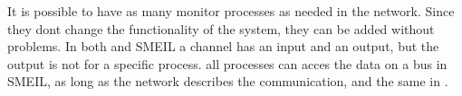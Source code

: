 
It is possible to have as many monitor processes as needed in the network. Since they dont change the functionality of the system, they can be added without problems. In both \cspm and SMEIL a channel has an input and an output, but the output is not for a specific process. all processes can acces the data on a bus in SMEIL, as long as the network describes the communication, and the same in \cspm.






